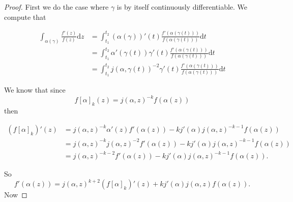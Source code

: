 \documentclass{article}
\theoremstyle{definition}
\theoremstyle{definition}
\theoremstyle{definition}
\begin{document}
\begin{proof}
    First we do the case where $\gamma$ is by itself continuously differentiable. We compute that

\begin{align}
  \int_{\alpha (\gamma)} \frac{f' (z)}{f (z)} \mathrm{d} z
  &=  \int_{t_1}^{t_2} (\alpha (\gamma))' (t)  \frac{f' (\alpha (\gamma (t)))}{f
  (\alpha (\gamma (t)))} \mathrm{d} t \nonumber\\
  &=  \int_{t_1}^{t_2} \alpha' (\gamma (t)) \gamma' (t)  \frac{f' (\alpha (\gamma
  (t)))}{f (\alpha (\gamma (t)))} \mathrm{d} t \nonumber\\
  &= \int_{t_1}^{t_2} j (\alpha, \gamma (t))^{- 2} \gamma' (t)  \frac{f' (\alpha
  (\gamma (t)))}{f (\alpha (\gamma (t)))} \mathrm{d} t \nonumber
\end{align}

We know that since
\[ f [\alpha]_k (z) = j (\alpha, z)^{- k} f (\alpha (z)) \]
then

\begin{align}
  (f [\alpha]_k)' (z) &=  j (\alpha, z)^{- k} \alpha' (z) f' (\alpha (z)) -
  kj' (\alpha) j (\alpha, z)^{- k - 1} f (\alpha (z)) \nonumber\\
  &=  j (\alpha, z)^{- k} j (\alpha, z)^{- 2} f' (\alpha (z)) - kj' (\alpha) j
  (\alpha, z)^{- k - 1} f (\alpha (z)) \nonumber\\
  &=  j (\alpha, z)^{- k - 2} f' (\alpha (z)) - kj' (\alpha) j (\alpha, z)^{-
  k - 1} f (\alpha (z)).\nonumber
\end{align}

So
\[ f' (\alpha (z)) = j (\alpha, z)^{k + 2}  (f [\alpha]_k)' (z) + kj' (\alpha)
   j (\alpha, z) f (\alpha (z)). \]
Now


\end{proof}
\end{document}
